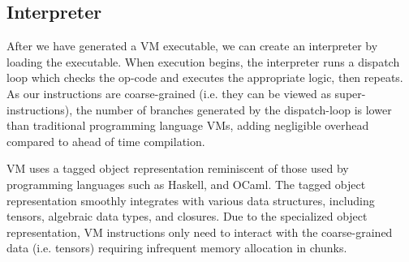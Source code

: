 \subsection{Interpreter}

After we have generated a VM executable,
we can create an interpreter by loading the executable. When execution begins, the interpreter runs a dispatch loop which checks the op-code and executes the appropriate logic, then repeats. As our instructions are coarse-grained (i.e. they can be viewed as super-instructions), the number of branches generated by the dispatch-loop is lower than traditional programming language VMs, adding negligible overhead compared to ahead of time compilation.

VM uses a tagged object representation reminiscent of those used by programming languages such as Haskell, and OCaml. The tagged object representation smoothly integrates with various data structures, including tensors, algebraic data types, and closures. Due to the specialized object representation, VM instructions only need to interact with the coarse-grained data (i.e. tensors) requiring infrequent memory allocation in chunks.

